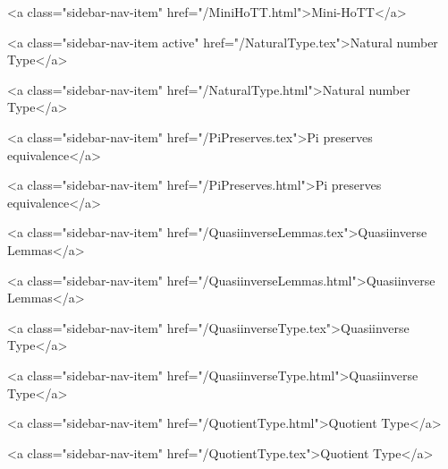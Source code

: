       
        
          <a class="sidebar-nav-item" href="/MiniHoTT.html">Mini-HoTT</a>
        
      
    
      
        
          <a class="sidebar-nav-item active" href="/NaturalType.tex">Natural number Type</a>
        
      
    
      
        
          <a class="sidebar-nav-item" href="/NaturalType.html">Natural number Type</a>
        
      
    
      
        
          <a class="sidebar-nav-item" href="/PiPreserves.tex">Pi preserves equivalence</a>
        
      
    
      
        
          <a class="sidebar-nav-item" href="/PiPreserves.html">Pi preserves equivalence</a>
        
      
    
      
        
          <a class="sidebar-nav-item" href="/QuasiinverseLemmas.tex">Quasiinverse Lemmas</a>
        
      
    
      
        
          <a class="sidebar-nav-item" href="/QuasiinverseLemmas.html">Quasiinverse Lemmas</a>
        
      
    
      
        
          <a class="sidebar-nav-item" href="/QuasiinverseType.tex">Quasiinverse Type</a>
        
      
    
      
        
          <a class="sidebar-nav-item" href="/QuasiinverseType.html">Quasiinverse Type</a>
        
      
    
      
        
          <a class="sidebar-nav-item" href="/QuotientType.html">Quotient Type</a>
        
      
    
      
        
          <a class="sidebar-nav-item" href="/QuotientType.tex">Quotient Type</a>
        

